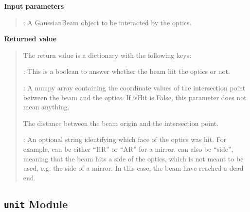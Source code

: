 \documentclass[letterpaper,10pt,english]{sphinxmanual}
\begin{document}
\begin{fulllineitems}
\begin{fulllineitems}
\textbf{Input parameters}
\begin{quote}

:
A GaussianBeam object to be interacted by the optics.
\end{quote}

\textbf{Returned value}
\begin{quote}

The return value is a dictionary with the following keys:

:
This is a boolean to answer whether the beam hit the optics
or not.

:
A numpy array containing the coordinate values of the intersection
point between the beam and the optics. If isHit is False, this parameter
does not mean anything.

The distance between the beam origin and the intersection point.

:
An optional string identifying which face of the optics was hit.
For example,  can be either ``HR'' or ``AR'' for a mirror.
 can also be ``side'', meaning that the beam hits a side
of the optics, which is not meant to be used, e.g. the side of a mirror.
In this case, the beam have reached a dead end.
\end{quote}

\end{fulllineitems}


\end{fulllineitems}



\subsection{\texttt{unit} Module}
\label{api/gtrace:unit-module}\label{api/gtrace:module-gtrace.unit}

\begin{fulllineitems}
\label{api/gtrace:gtrace.unit.deg2rad}
\end{fulllineitems}


\begin{fulllineitems}
\label{api/gtrace:gtrace.unit.rad2deg}
\end{fulllineitems}
\end{document}
